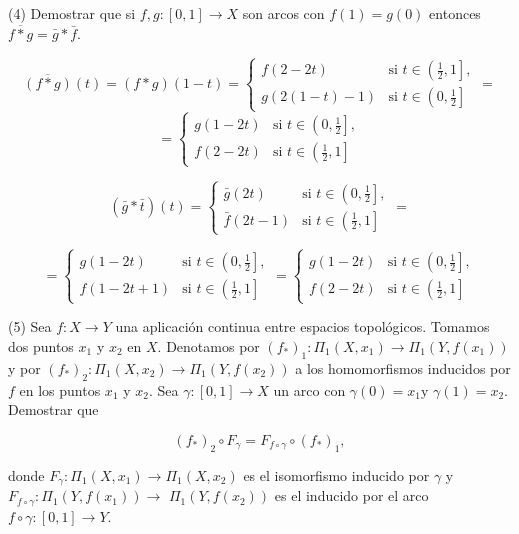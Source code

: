 \documentclass[
  a4paper,
  spanish,
  12pt,
]{scrartcl}
\begin{document}
\begin{ejer}
(4) Demostrar que si $f, g:[0,1] \rightarrow X$ son arcos con $f(1)=g(0)$ entonces $\overline{f * g}=\bar{g} * \bar{f}$.\\
\end{ejer}

$$
\overline{(f*g)}(t) = (f*g)(1-t) =
\begin{cases} 
    f(2 - 2t) & \text{si } t \in \left( \frac{1}{2}, 1 \right], \\
    g(2(1 - t) - 1) & \text{si } t \in \left( 0, \frac{1}{2} \right]
\end{cases} =
$$
$$
= \begin{cases} 
    g(1 - 2t) & \text{si } t \in \left( 0, \frac{1}{2} \right],  \\
    f(2 - 2t) & \text{si } t \in \left( \frac{1}{2}, 1 \right]
\end{cases}
$$

$$
(\bar{g}*\bar{t})(t) = 
\begin{cases} 
    \bar{g}(2t) & \text{si } t \in \left( 0, \frac{1}{2} \right], \\
    \bar{f}(2t-1) & \text{si } t \in \left( \frac{1}{2}, 1 \right]
\end{cases} =
$$

$$
= \begin{cases} 
    g(1-2t) & \text{si } t \in \left( 0, \frac{1}{2} \right], \\
    f(1-2t+1) & \text{si } t \in \left( \frac{1}{2}, 1 \right]
\end{cases} =
\begin{cases} 
    g(1-2t) & \text{si } t \in \left( 0, \frac{1}{2} \right], \\
    f(2-2t) & \text{si } t \in \left( \frac{1}{2}, 1 \right]
\end{cases}
$$

\begin{ejer}
(5) Sea $f: X \rightarrow Y$ una aplicación continua entre espacios topológicos. Tomamos dos puntos $x_{1}$ y $x_{2}$ en $X$. Denotamos por $\left(f_{*}\right)_{1}: \Pi_{1}\left(X, x_{1}\right) \rightarrow \Pi_{1}\left(Y, f\left(x_{1}\right)\right)$ y por $\left(f_{*}\right)_{2}: \Pi_{1}\left(X, x_{2}\right) \rightarrow \Pi_{1}\left(Y, f\left(x_{2}\right)\right)$ a los homomorfismos inducidos por $f$ en los puntos $x_{1}$ y $x_{2}$. Sea $\gamma:[0,1] \rightarrow X$ un arco con $\gamma(0)=x_{1} \mathrm{y}$ $\gamma(1)=x_{2}$. Demostrar que

$$
\left(f_{*}\right)_{2} \circ F_{\gamma}=F_{f \circ \gamma} \circ\left(f_{*}\right)_{1},
$$

donde $F_{\gamma}: \Pi_{1}\left(X, x_{1}\right) \rightarrow \Pi_{1}\left(X, x_{2}\right)$ es el isomorfismo inducido por $\gamma$ y $F_{f \circ \gamma}: \Pi_{1}\left(Y, f\left(x_{1}\right)\right) \rightarrow$ $\Pi_{1}\left(Y, f\left(x_{2}\right)\right)$ es el inducido por el arco $f \circ \gamma:[0,1] \rightarrow Y$.\\
\end{ejer}
\end{document}
